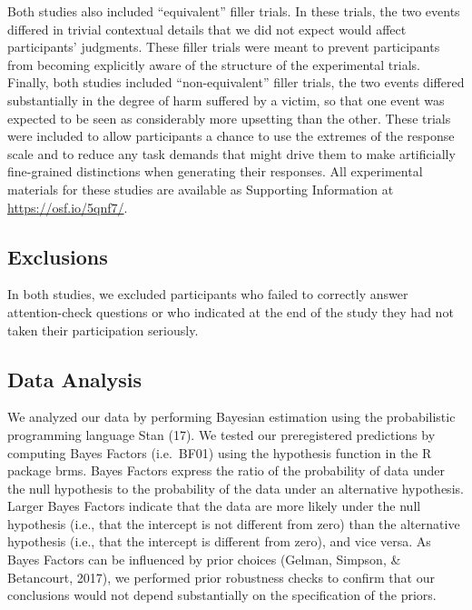 \documentclass[9pt,twocolumn,twoside,lineno]{pnas-new}
\begin{document}
Both studies also included ``equivalent'' filler trials. In these
trials, the two events differed in trivial contextual details that we
did not expect would affect participants' judgments. These filler trials
were meant to prevent participants from becoming explicitly aware of the
structure of the experimental trials. Finally, both studies included
``non-equivalent'' filler trials, the two events differed substantially
in the degree of harm suffered by a victim, so that one event was
expected to be seen as considerably more upsetting than the other. These
trials were included to allow participants a chance to use the extremes
of the response scale and to reduce any task demands that might drive
them to make artificially fine-grained distinctions when generating
their responses. All experimental materials for these studies are
available as Supporting Information at \url{https://osf.io/5qnf7/}.

\subsection*{Exclusions}\label{exclusions}

In both studies, we excluded participants who failed to correctly answer
attention-check questions or who indicated at the end of the study they
had not taken their participation seriously.

\subsection*{Data Analysis}\label{data-analysis}

We analyzed our data by performing Bayesian estimation using the
probabilistic programming language Stan (17). We tested our
preregistered predictions by computing Bayes Factors (i.e.~BF01) using
the hypothesis function in the R package brms. Bayes Factors express the
ratio of the probability of data under the null hypothesis to the
probability of the data under an alternative hypothesis. Larger Bayes
Factors indicate that the data are more likely under the null hypothesis
(i.e., that the intercept is not different from zero) than the
alternative hypothesis (i.e., that the intercept is different from
zero), and vice versa. As Bayes Factors can be influenced by prior
choices (Gelman, Simpson, \& Betancourt, 2017), we performed prior
robustness checks to confirm that our conclusions would not depend
substantially on the specification of the priors.
\end{document}
